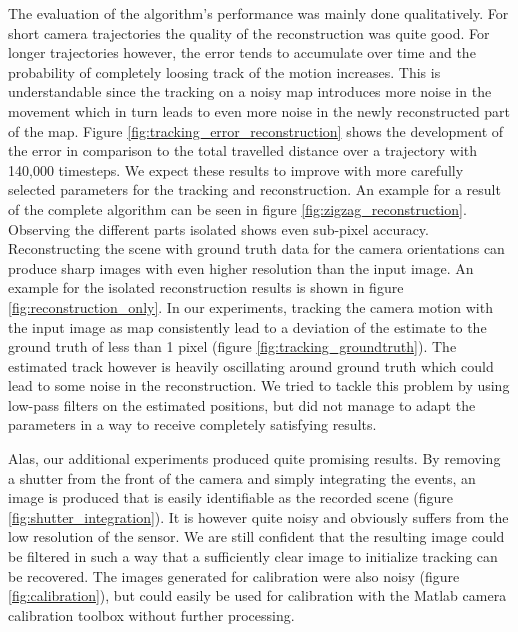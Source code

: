 The evaluation of the algorithm's performance was mainly done qualitatively.
For short camera trajectories the quality of the reconstruction was quite good.
For longer trajectories however, the error tends to accumulate over time and the
probability of completely loosing track of the motion increases.
This is understandable since the tracking on a noisy map introduces more noise
in the movement which in turn leads to even more noise in the newly reconstructed
part of the map.
Figure \ref{fig:tracking_error_reconstruction} shows the development of the error
in comparison to the total travelled distance over a trajectory with 140,000 timesteps.
We expect these results to improve with more carefully selected parameters for the
tracking and reconstruction.
An example for a result of the complete algorithm can be seen in figure \ref{fig:zigzag_reconstruction}.
Observing the different parts isolated shows even sub-pixel accuracy.
Reconstructing the scene with ground truth data for the camera orientations can produce sharp images
with even higher resolution than the input image. An example for the isolated reconstruction results
is shown in figure \ref{fig:reconstruction_only}.
In our experiments, tracking the camera motion with the input image as map consistently lead to a deviation
of the estimate to the ground truth of less than 1 pixel (figure \ref{fig:tracking_groundtruth}). The estimated track however is heavily oscillating
around ground truth which could lead to some noise in the reconstruction. We tried to tackle
this problem by using low-pass filters on the estimated positions, but did not manage to
adapt the parameters in a way to receive completely satisfying results.

Alas, our additional experiments produced quite promising results.
By removing a shutter from the front of the camera and simply integrating the events,
an image is produced that is easily identifiable as the recorded scene (figure \ref{fig:shutter_integration}).
It is however quite noisy and obviously suffers from the low resolution of the sensor.
We are still confident that the resulting image could be filtered in such a way that
a sufficiently clear image to initialize tracking can be recovered.
The images generated for calibration were also noisy (figure \ref{fig:calibration}), but could easily be used
for calibration with the Matlab camera calibration toolbox without further processing.

